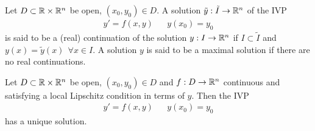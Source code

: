 \documentclass[../../script.tex]{subfiles}
\begin{document}
\begin{defi}
    Let $D \subset \mathbb{R} \times \mathbb{R}^n$ be open, $(x_0, y_0) \in D$. A solution $\tilde{y}: \tilde{I} \rightarrow \mathbb{R}^n$ of the IVP 
    \begin{align*}
        y' = f(x, y) && y(x_0) = y_0
    \end{align*}
    is said to be a (real) continuation of the solution $y: I \rightarrow \mathbb{R}^n$ if $I \subset \tilde{I}$ and $y(x) = \tilde{y}(x) ~~\forall x \in I$.
    A solution $y$ is said to be a maximal solution if there are no real continuations.
\end{defi}

\begin{thm}
    Let $D \subset \mathbb{R} \times \mathbb{R}^n$ be open, $(x_0, y_0) \in D$ and $f: D \rightarrow \mathbb{R}^n$ continuous and satisfying a local Lipschitz condition in terms of $y$.
    Then the IVP 
    \begin{align*}
        y' = f(x, y) && y(x_0) = y_0
    \end{align*}
    has a unique solution.
\end{thm}
\end{document}
